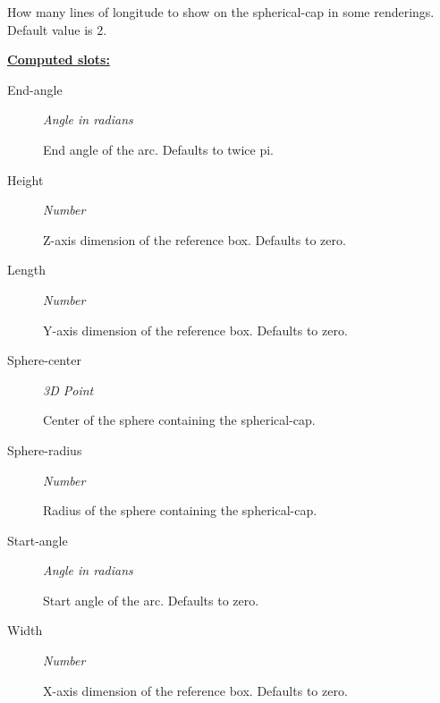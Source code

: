 \documentclass [11pt]{book}
\begin{document}
\begin{itemize}
\begin{description}
 How many lines of longitude to show on the spherical-cap in some renderings. Default value is 2.




\end{description}






\textbf{
\underline{Computed slots:}}

\begin{description}

\item [End-angle]
\emph{Angle in radians}

 End angle of the arc. Defaults to twice pi.




\item [Height]
\emph{Number}

 Z-axis dimension of the reference box. Defaults to zero.




\item [Length]
\emph{Number}

 Y-axis dimension of the reference box. Defaults to zero.




\item [Sphere-center]
\emph{3D Point}

 Center of the sphere containing the spherical-cap.




\item [Sphere-radius]
\emph{Number}

 Radius of the sphere containing the spherical-cap.




\item [Start-angle]
\emph{Angle in radians}

 Start angle of the arc. Defaults to zero.




\item [Width]
\emph{Number}

 X-axis dimension of the reference box. Defaults to zero.




\end{description}








\end{itemize}
\end{document}
